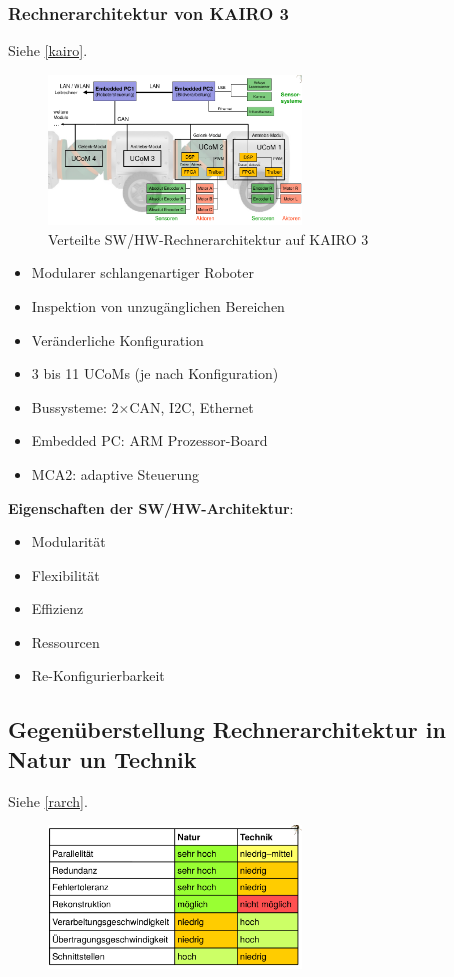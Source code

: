 \subsubsection{Rechnerarchitektur von KAIRO 3}
Siehe \autoref{kairo}.
\begin{figure}[h!]
	\centering
	\includegraphics[width=0.6\textwidth]{figures/ch07_kairo-3.png}
	\caption{Verteilte SW/HW-Rechnerarchitektur auf KAIRO 3}
	\label{kairo}
\end{figure}
\begin{itemize}
\item Modularer schlangenartiger Roboter
\item Inspektion von unzugänglichen Bereichen
\item Veränderliche Konfiguration
\item 3 bis 11 UCoMs (je nach Konfiguration)
\item Bussysteme: 2$\times$CAN, I2C, Ethernet
\item Embedded PC: ARM Prozessor-Board
\item MCA2: adaptive Steuerung
\end{itemize}
\textbf{Eigenschaften der SW/HW-Architektur}:
\begin{itemize}
\item Modularität
\item Flexibilität
\item Effizienz
\item Ressourcen
\item Re-Konfigurierbarkeit
\end{itemize}
\subsection{Gegenüberstellung Rechnerarchitektur in Natur un Technik}
Siehe \autoref{rarch}.
\begin{figure}[h!]
	\centering
	\includegraphics[width=0.6\textwidth]{figures/ch07_rechnerarchitektur.png}
	\caption{}
	\label{rarch}
\end{figure}